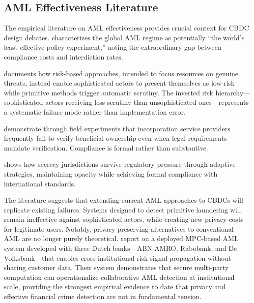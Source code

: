 \documentclass[11pt]{article}
\begin{document}
\subsection{AML Effectiveness Literature}

The empirical literature on AML effectiveness provides crucial context for CBDC design debates. \citet{Pol2020} characterizes the global AML regime as potentially ``the world's least effective policy experiment,'' noting the extraordinary gap between compliance costs and interdiction rates.

\citet{Levi2020} documents how risk-based approaches, intended to focus resources on genuine threats, instead enable sophisticated actors to present themselves as low-risk while primitive methods trigger automatic scrutiny. The inverted risk hierarchy---sophisticated actors receiving less scrutiny than unsophisticated ones---represents a systematic failure mode rather than implementation error.

\citet{Findley2014} demonstrate through field experiments that incorporation service providers frequently fail to verify beneficial ownership even when legal requirements mandate verification. Compliance is formal rather than substantive.

\citet{Sharman2017} shows how secrecy jurisdictions survive regulatory pressure through adaptive strategies, maintaining opacity while achieving formal compliance with international standards.

The literature suggests that extending current AML approaches to CBDCs will replicate existing failures. Systems designed to detect primitive laundering will remain ineffective against sophisticated actors, while creating new privacy costs for legitimate users. Notably, privacy-preserving alternatives to conventional AML are no longer purely theoretical. \citet{vanEgmond2024} report on a deployed MPC-based AML system developed with three Dutch banks---ABN AMRO, Rabobank, and De Volksbank---that enables cross-institutional risk signal propagation without sharing customer data. Their system demonstrates that secure multi-party computation can operationalize collaborative AML detection at institutional scale, providing the strongest empirical evidence to date that privacy and effective financial crime detection are not in fundamental tension.
\end{document}
